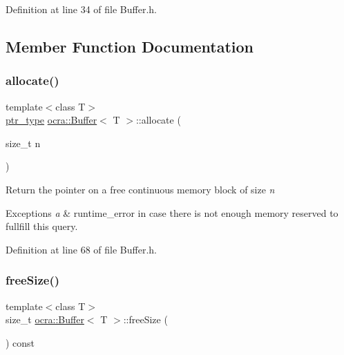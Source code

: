 Definition at line 34 of file Buffer.\+h.



\subsection{Member Function Documentation}
\hypertarget{classocra_1_1Buffer_a693db1946acad229a8e7ab84ac910301}{}\label{classocra_1_1Buffer_a693db1946acad229a8e7ab84ac910301} 
\subsubsection{\texorpdfstring{allocate()}{allocate()}}
{\footnotesize\ttfamily template$<$class T$>$ \\
\hyperlink{classocra_1_1Buffer_a26bf1dc373e2144eddd0dd8be4b37f84}{ptr\+\_\+type} \hyperlink{classocra_1_1Buffer}{ocra\+::\+Buffer}$<$ T $>$\+::allocate (\begin{DoxyParamCaption}\item[{size\+\_\+t}]{n }\end{DoxyParamCaption})\hspace{0.3cm}{\ttfamily [inline]}}

Return the pointer on a free continuous memory block of size {\itshape n} 


\begin{DoxyExceptions}{Exceptions}
{\em a} & runtime\+\_\+error in case there is not enough memory reserved to fullfill this query. \\
\hline
\end{DoxyExceptions}


Definition at line 68 of file Buffer.\+h.

\hypertarget{classocra_1_1Buffer_adf28f390748a3f97df43b08fb0574e6a}{}\label{classocra_1_1Buffer_adf28f390748a3f97df43b08fb0574e6a} 
\subsubsection{\texorpdfstring{free\+Size()}{freeSize()}}
{\footnotesize\ttfamily template$<$class T$>$ \\
size\+\_\+t \hyperlink{classocra_1_1Buffer}{ocra\+::\+Buffer}$<$ T $>$\+::free\+Size (\begin{DoxyParamCaption}{ }\end{DoxyParamCaption}) const\hspace{0.3cm}{\ttfamily [inline]}}

